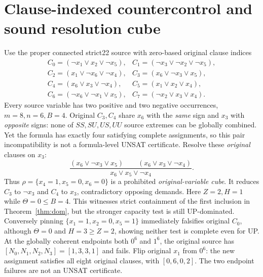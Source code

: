 \documentclass[10pt]{article}
\begin{document}
\section{Clause-indexed countercontrol and sound resolution cube}
Use the proper connected strict22 source with zero-based original clause indices
\[
\begin{array}{llll}
C_0=(\neg x_1\vee x_2\vee\neg x_5),& C_1=(\neg x_3\vee\neg x_2\vee\neg x_5),\\
C_2=(x_1\vee\neg x_6\vee\neg x_4),& C_3=(x_6\vee\neg x_3\vee x_5),\\
C_4=(x_6\vee x_3\vee\neg x_4),& C_5=(x_1\vee x_2\vee x_4),\\
C_6=(\neg x_6\vee\neg x_1\vee x_5),& C_7=(\neg x_2\vee x_3\vee x_4).
\end{array}
\]
Every source variable has two positive and two negative occurrences, $m=8,n=6,B=4$. Original $C_3,C_4$ share $x_6$ with the \emph{same} sign and $x_3$ with \emph{opposite} signs: none of $SS,SU,US,UU$ source extremes can be globally combined. Yet the formula has exactly four satisfying complete assignments, so this pair incompatibility is not a formula-level UNSAT certificate. Resolve these \emph{original} clauses on $x_3$:
\[
\frac{(x_6\vee\neg x_3\vee x_5)\qquad(x_6\vee x_3\vee\neg x_4)}
{\boxed{x_6\vee x_5\vee\neg x_4}}.
\]
Thus $\rho=\{x_4=1,x_5=0,x_6=0\}$ is a prohibited \emph{original-variable cube}. It reduces $C_3$ to $\neg x_3$ and $C_4$ to $x_3$, contradictory opposing demands. Here $Z=2,H=1$ while $\Theta=0\le B=4$. This witnesses strict containment of the first inclusion in Theorem~\ref{thm:dom}, but the stronger capacity test is still UP-dominated. Conversely pinning $\{x_1=1,x_2=0,x_5=1\}$ immediately falsifies original $C_0$, although $\Theta=0$ and $H=3\ge Z=2$, showing neither test is complete even for UP.
At the globally coherent endpoints both $0^6$ and $1^6$, the original source has $[N_0,N_1,N_2,N_3]=[1,3,3,1]$ and fails. Flip original $x_1$ from $0^6$: the new assignment satisfies all eight original clauses, with $[0,6,0,2]$. The two endpoint failures are not an UNSAT certificate.
\end{document}
